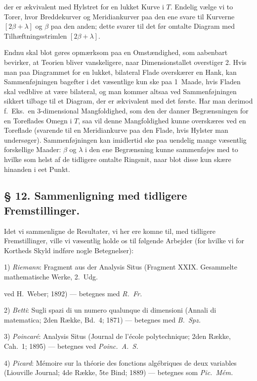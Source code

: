 \documentclass{article}
\begin{document}
der er ækvivalent med Hylstret for en lukket Kurve i $T$. Endelig vælge vi to Torer, hvor Breddekurver og Meridiankurver paa den ene svare til Kurverne $[2\beta + \lambda]$ og $\beta$ paa den anden; dette svarer til det før omtalte Diagram med Tilhæftningsstrimlen $[2\beta + \lambda]$.

Endnu skal blot gøres opmærksom paa en Omstændighed, som aabenbart bevirker, at Teorien bliver vanskeligere, naar Dimensionstallet overstiger 2. Hvis man paa Diagrammet for en lukket, bilateral Flade overskærer en Hank, kan Sammenføjningen bagefter i det væsentlige kun ske paa 1~Maade, hvis Fladen skal vedblive at være bilateral, og man kommer altsaa ved Sammenføjningen sikkert tilbage til et Diagram, der er ækvivalent med det første. Har man derimod f.~Eks.\ en 3-dimensional Mangfoldighed, som den der danner Begrænsningen for en Toreflades Omegn i $T$, saa vil denne Mangfoldighed kunne overskæres ved en Toreflade (svarende til en Meridiankurve paa den Flade, hvis Hylster man undersøger). Sammenføjningen kan imidlertid ske paa uendelig mange væsentlig forskellige Maader: $\beta$ og $\lambda$ i den ene Begrænsning kunne sammenføjes med to hvilke som helst af de tidligere omtalte Ringsnit, naar blot disse kun skære hinanden i eet Punkt.

\subsection*{§ 12. Sammenligning med tidligere Fremstillinger.}

Idet vi sammenligne de Resultater, vi her ere komne til, med tidligere Fremstillinger, ville vi væsentlig holde os til følgende Arbejder (for hvilke vi for Kortheds Skyld indføre nogle Betegnelser):

1) \emph{Riemann}: Fragment aus der Analysis Situs (Fragment XXIX. Gesammelte mathematische Werke, 2.\ Udg.

ved H.~Weber; 1892) --- betegnes med \emph{R.~Fr.}

2) \emph{Betti}: Sugli spazi di un numero qualunque di dimensioni (Annali di matematica; 2den Række, Bd.\ 4; 1871) --- betegnes med \emph{B.~Spz.}

3) \emph{Poincaré}: Analysis Situs (Journal de l'école polytechnique; 2den Række, Cah.\ 1; 1895) --- betegnes ved \emph{Poinc.~A.~S.}

4) \emph{Picard}: Mémoire sur la théorie des fonctions algébriques de deux variables (Liouville Journal; 4de Række, 5te Bind; 1889) --- betegnes som \emph{Pic.~Mém.}
\end{document}
